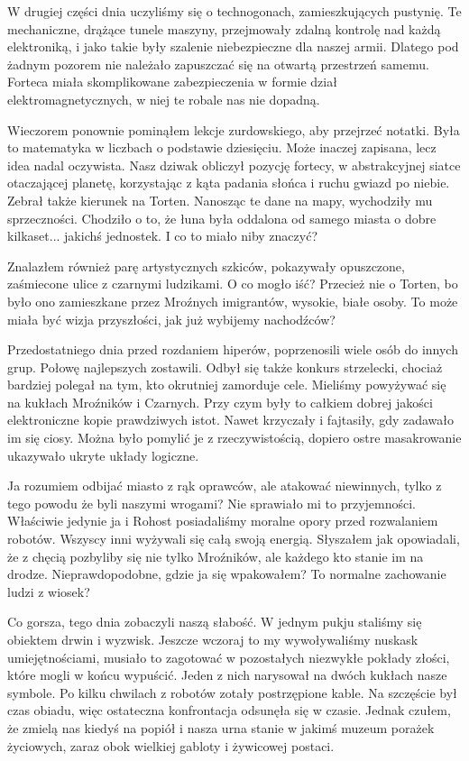 W drugiej części dnia uczyliśmy się o technogonach, zamieszkujących pustynię.
Te mechaniczne, drążące tunele maszyny, przejmowały zdalną kontrolę nad każdą elektroniką, i jako takie były szalenie niebezpieczne dla naszej armii.
Dlatego pod żadnym pozorem nie należało zapuszczać się na otwartą przestrzeń samemu.
Forteca miała skomplikowane zabezpieczenia w formie dział elektromagnetycznych, w niej te robale nas nie dopadną.

Wieczorem ponownie pominąłem lekcje zurdowskiego, aby przejrzeć notatki.
Była to matematyka w liczbach o podstawie dziesięciu. Może inaczej zapisana, lecz idea nadal oczywista.
Nasz dziwak obliczył pozycję fortecy, w abstrakcyjnej siatce otaczającej planetę, korzystając z kąta padania słońca i ruchu gwiazd po niebie.
Zebrał także kierunek na Torten.
Nanosząc te dane na mapy, wychodziły mu sprzeczności.
Chodziło o to, że łuna była oddalona od samego miasta o dobre kilkaset... jakichś jednostek.
I co to miało niby znaczyć?

Znalazłem również parę artystycznych szkiców, pokazywały opuszczone, zaśmiecone ulice z czarnymi ludzikami.
O co mogło iść? Przecież nie o Torten, bo było ono zamieszkane przez Mroźnych imigrantów, wysokie, białe osoby.
To może miała być wizja przyszłości, jak już wybijemy nachodźców?

Przedostatniego dnia przed rozdaniem hiperów, poprzenosili wiele osób do innych grup.
Połowę najlepszych zostawili.
Odbył się także konkurs strzelecki, chociaż bardziej polegał na tym, kto okrutniej zamorduje cele.
Mieliśmy powyżywać się na kukłach Mroźników i Czarnych.
Przy czym były to całkiem dobrej jakości elektroniczne kopie prawdziwych istot.
Nawet krzyczały i fajtasiły, gdy zadawało im się ciosy.
Można było pomylić je z rzeczywistością, dopiero ostre masakrowanie ukazywało ukryte układy logiczne.

Ja rozumiem odbijać miasto z rąk oprawców, ale atakować niewinnych, tylko z tego powodu że byli naszymi wrogami?
Nie sprawiało mi to przyjemności.
Właściwie jedynie ja i Rohost posiadaliśmy moralne opory przed rozwalaniem robotów.
Wszyscy inni wyżywali się całą swoją energią.
Słyszałem jak opowiadali, że z chęcią pozbyliby się nie tylko Mroźników, ale każdego kto stanie im na drodze. 
Nieprawdopodobne, gdzie ja się wpakowałem? To normalne zachowanie ludzi z wiosek?

Co gorsza, tego dnia zobaczyli naszą słabość.
W jednym pukju staliśmy się obiektem drwin i wyzwisk.
Jeszcze wczoraj to my wywoływaliśmy nuskask umiejętnościami, musiało to zagotować w pozostałych niezwykłe pokłady złości, które mogli w końcu wypuścić.
Jeden z nich narysował na dwóch kukłach nasze symbole. Po kilku chwilach z robotów zotały postrzępione kable.
Na szczęście był czas obiadu, więc ostateczna konfrontacja odsunęła się w czasie.
Jednak czułem, że zmielą nas kiedyś na popiół i nasza urna stanie w jakimś muzeum porażek życiowych, zaraz obok wielkiej gabloty i żywicowej postaci.

